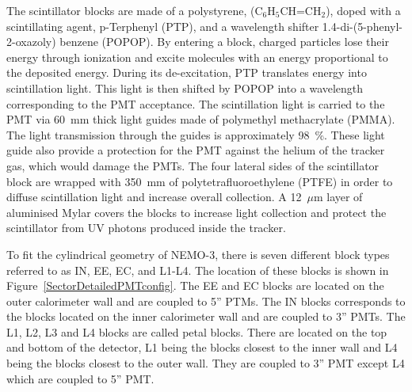 \documentclass[main.tex]{subfiles}
\begin{document}
\NI The scintillator blocks are made of a polystyrene, (C$_\text{6}$H$_\text{5}$CH=CH$_\text{2}$), doped with a scintillating agent, p-Terphenyl (PTP), and a wavelength shifter 1.4-di-(5-phenyl-2-oxazoly) benzene (POPOP). By entering a block, charged particles lose their energy through ionization and excite molecules with an energy proportional to the deposited energy. During its de-excitation, PTP translates energy into scintillation light. This light is then shifted by POPOP into a wavelength corresponding to the PMT acceptance. The scintillation light is carried to the PMT via 60~mm thick light guides made of polymethyl methacrylate (PMMA). The light transmission through the guides is approximately 98~\%. These light guide also provide a protection for the PMT against the helium of the tracker gas, which would damage the PMTs. The four lateral sides of the scintillator block are wrapped with 350~mm of polytetrafluoroethylene (PTFE) in order to diffuse scintillation light and increase overall collection. A 12~$\mu$m layer of aluminised Mylar covers the blocks to increase light collection and protect the scintillator from UV photons produced inside the tracker.


\bigskip




\bigskip


\NI To fit the cylindrical geometry of NEMO-3, there is seven different block types referred to as IN, EE, EC, and L1-L4. The location of these blocks is shown in Figure~\ref{SectorDetailedPMTconfig}. The EE and EC blocks are located on the outer calorimeter wall and are coupled to 5'' PTMs. The IN blocks corresponds to the blocks located on the inner calorimeter wall and are coupled to 3'' PMTs. The L1, L2, L3 and L4 blocks are called petal blocks. There are located on the top and bottom of the detector, L1 being the blocks closest to the inner wall and L4 being the blocks closest to the outer wall. They are coupled to 3'' PMT except L4 which are coupled to 5'' PMT.  
\end{document}
